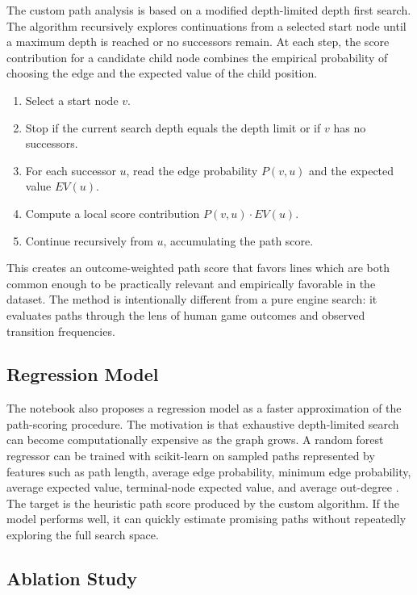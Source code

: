\documentclass[11pt,a4paper]{article}
\begin{document}
The custom path analysis is based on a modified depth-limited depth first search.
The algorithm recursively explores continuations from a selected start node until a maximum depth is reached or no successors remain.
At each step, the score contribution for a candidate child node combines the empirical probability of choosing the edge and the expected value of the child position.

\begin{enumerate}
  \item Select a start node \(v\).
  \item Stop if the current search depth equals the depth limit or if \(v\) has no successors.
  \item For each successor \(u\), read the edge probability \(P(v,u)\) and the expected value \(EV(u)\).
  \item Compute a local score contribution \(P(v,u) \cdot EV(u)\).
  \item Continue recursively from \(u\), accumulating the path score.
\end{enumerate}

This creates an outcome-weighted path score that favors lines which are both common enough to be practically relevant and empirically favorable in the dataset.
The method is intentionally different from a pure engine search: it evaluates paths through the lens of human game outcomes and observed transition frequencies.

\subsection{Regression Model}

The notebook also proposes a regression model as a faster approximation of the path-scoring procedure.
The motivation is that exhaustive depth-limited search can become computationally expensive as the graph grows.
A random forest regressor can be trained with scikit-learn on sampled paths represented by features such as path length, average edge probability, minimum edge probability, average expected value, terminal-node expected value, and average out-degree \citep{scikitLearn}.
The target is the heuristic path score produced by the custom algorithm.
If the model performs well, it can quickly estimate promising paths without repeatedly exploring the full search space.

\subsection{Ablation Study}
\end{document}
